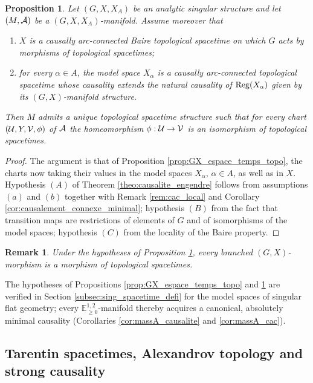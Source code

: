 \documentclass[a4paper,twoside]{article}
\newcommand{\mass}[1]{\mathbb{E}^{1,2}_{#1}}
\newtheorem{prop}[lem]{Proposition}
\newtheorem{rem}[lem]{Remark}
\begin{document}
\begin{prop}\label{prop:GX_sing_espace_temps_topo} Let $(G,X,X_A)$ be an analytic singular structure and
let $(M,\mathcal A)$ be a $(G,X,X_A)$-manifold. Assume moreover that
\begin{enumerate}[label=(\alph*)]
\item $X$ is a causally arc-connected Baire topological spacetime on which $G$ acts by morphisms of topological spacetimes;
\item for every $\alpha \in A$, the model space $X_\alpha$ is a causally arc-connected topological spacetime whose causality extends the natural causality of $\mathrm{Reg}(X_\alpha)$ given by its $(G,X)$-manifold structure.
\end{enumerate}
Then $M$ admits a unique topological spacetime structure such that for every chart $(\mathcal{U},Y,\mathcal V,\phi)$ of $\mathcal A$
the homeomorphism $\phi:\mathcal{U}\rightarrow \mathcal V$ is an isomorphism of topological spacetimes.
\end{prop}
\begin{proof}
The argument is that of Proposition \ref{prop:GX_espace_temps_topo}, the charts now taking
their values in the model spaces $X_\alpha$, $\alpha\in A$, as well as in $X$. Hypothesis
$(A)$ of Theorem \ref{theo:causalite_engendre} follows from assumptions $(a)$ and $(b)$
together with Remark \ref{rem:cac_local} and Corollary \ref{cor:causalement_connexe_minimal}; hypothesis $(B)$ from the
fact that transition maps are restrictions of elements of $G$ and of isomorphisms of the
model spaces; hypothesis $(C)$ from the locality of the Baire property.
\end{proof}

\begin{rem}\label{rem:hypotheses_proposition_prop_gx} Under the hypotheses of Proposition \ref{prop:GX_sing_espace_temps_topo}, every
branched $(G,X)$-morphism is a morphism of topological spacetimes.
\end{rem}

The hypotheses of Propositions \ref{prop:GX_espace_temps_topo} and
\ref{prop:GX_sing_espace_temps_topo} are verified in Section \ref{subsec:sing_spacetime_defi} for
the model spaces of singular flat geometry; every $\mass{\geq0}$-manifold thereby acquires a
canonical, absolutely minimal causality (Corollaries \ref{cor:massA_causalite} and
\ref{cor:massA_cac}).

\subsection{Tarentin spacetimes, Alexandrov topology and strong causality}
\end{document}
